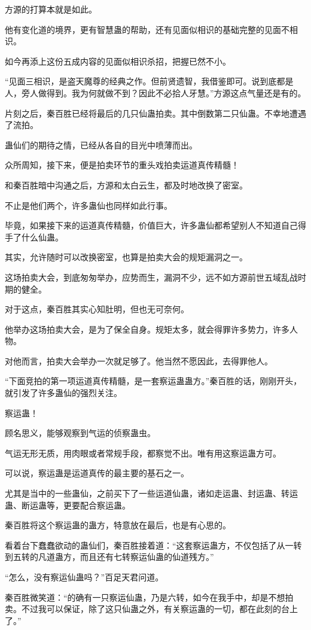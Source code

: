 \begin{this_body}
方源的打算本就是如此。

他有变化道的境界，更有智慧蛊的帮助，还有见面似相识的基础完整的见面不相识。

如今再添上这份五成内容的见面似相识杀招，把握已然不小。

“见面三相识，是盗天魔尊的经典之作。但前贤遗智，我借鉴即可。说到底都是人，旁人做得到。我为何就做不到？因此不必拾人牙慧。”方源这点气量还是有的。

片刻之后，秦百胜已经将最后的几只仙蛊拍卖。其中倒数第二只仙蛊。不幸地遭遇了流拍。

蛊仙们的期待之情，已经从各自的目光中喷薄而出。

众所周知，接下来，便是拍卖环节的重头戏拍卖运道真传精髓！

和秦百胜暗中沟通之后，方源和太白云生，都及时地改换了密室。

不止是他们两个，许多蛊仙也同样如此行事。

毕竟，如果接下来的运道真传精髓，价值巨大，许多蛊仙都希望别人不知道自己得手了什么仙蛊。

其实，允许随时可以改换密室，也算是拍卖大会的规矩漏洞之一。

这场拍卖大会，到底匆匆举办，应势而生，漏洞不少，远不如方源前世五域乱战时期的健全。

对于这点，秦百胜其实心知肚明，但也无可奈何。

他举办这场拍卖大会，是为了保全自身。规矩太多，就会得罪许多势力，许多人物。

对他而言，拍卖大会举办一次就足够了。他当然不愿因此，去得罪他人。

“下面竞拍的第一项运道真传精髓，是一套察运蛊蛊方。”秦百胜的话，刚刚开头，就引发了许多蛊仙的强烈关注。

察运蛊！

顾名思义，能够观察到气运的侦察蛊虫。

气运无形无质，用肉眼或者常规手段，都察觉不出。唯有用这察运蛊方可。

可以说，察运蛊是运道真传的最主要的基石之一。

尤其是当中的一些蛊仙，之前买下了一些运道仙蛊，诸如走运蛊、封运蛊、转运蛊、断运蛊等，更要配合察运蛊。

秦百胜将这个察运蛊的蛊方，特意放在最后，也是有心思的。

看着台下蠢蠢欲动的蛊仙们，秦百胜接着道：“这套察运蛊方，不仅包括了从一转到五转的凡道蛊方，而且还有七转察运仙蛊的仙道残方。”

“怎么，没有察运仙蛊吗？”百足天君问道。

秦百胜微笑道：“的确有一只察运仙蛊，乃是六转，如今在我手中，却是不想拍卖。不过我可以保证，除了这只仙蛊之外，有关察运蛊的一切，都在此刻的台上了。”


\end{this_body}

